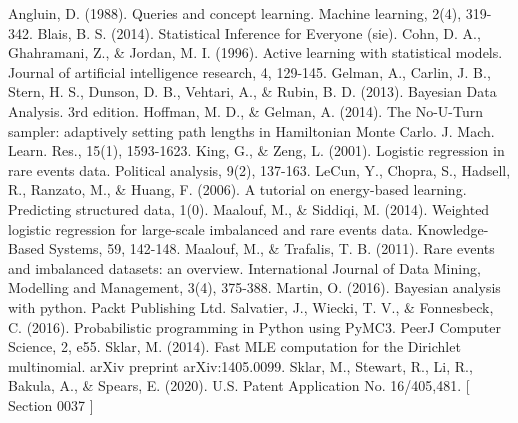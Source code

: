 \documentclass[twoside]{article}
\begin{document}
\begin{thebibliography}{20}

Angluin, D. (1988). Queries and concept learning. Machine learning, 2(4), 319-342.
Blais, B. S. (2014). Statistical Inference for Everyone (sie).
Cohn, D. A., Ghahramani, Z., \& Jordan, M. I. (1996). Active learning with statistical models. Journal of artificial intelligence research, 4, 129-145.
Gelman, A., Carlin, J. B., Stern, H. S., Dunson, D. B., Vehtari, A., \& Rubin, B. D. (2013). Bayesian Data Analysis. 3rd edition.
Hoffman, M. D., \& Gelman, A. (2014). The No-U-Turn sampler: adaptively setting path lengths in Hamiltonian Monte Carlo. J. Mach. Learn. Res., 15(1), 1593-1623.
King, G., \& Zeng, L. (2001). Logistic regression in rare events data. Political analysis, 9(2), 137-163.
LeCun, Y., Chopra, S., Hadsell, R., Ranzato, M., \& Huang, F. (2006). A tutorial on energy-based learning. Predicting structured data, 1(0).
Maalouf, M., \& Siddiqi, M. (2014). Weighted logistic regression for large-scale imbalanced and rare events data. Knowledge-Based Systems, 59, 142-148.
Maalouf, M., \& Trafalis, T. B. (2011). Rare events and imbalanced datasets: an overview. International Journal of Data Mining, Modelling and Management, 3(4), 375-388.
Martin, O. (2016). Bayesian analysis with python. Packt Publishing Ltd.
Salvatier, J., Wiecki, T. V., \& Fonnesbeck, C. (2016). Probabilistic programming in Python using PyMC3. PeerJ Computer Science, 2, e55.
Sklar, M. (2014). Fast MLE computation for the Dirichlet multinomial. arXiv preprint arXiv:1405.0099.
Sklar, M., Stewart, R., Li, R., Bakula, A., \& Spears, E. (2020). U.S. Patent Application No. 16/405,481. [ Section 0037 ]

\end{thebibliography}
\end{document}
